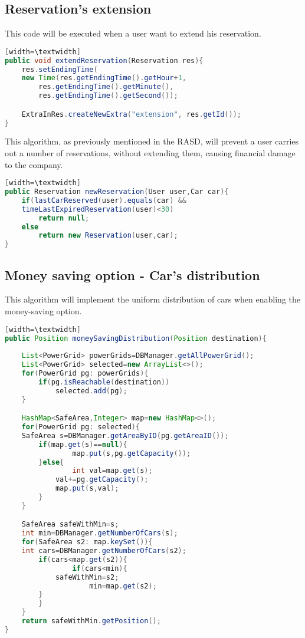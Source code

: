\documentclass[10pt, a4paper,titlepage]{article}
\begin{document}
\subsection*{Reservation's extension}
This code will be executed when a user want to extend his reservation.
\begin{lstlisting}[language=Java][width=\textwidth]
public void extendReservation(Reservation res){
    res.setEndingTime(
	new Time(res.getEndingTime().getHour+1,
		res.getEndingTime().getMinute(),
		res.getEndingTime().getSecond());

    ExtraInRes.createNewExtra("extension", res.getId());
}
\end{lstlisting}
\bigskip
\bigskip
This algorithm, as previously mentioned in the RASD, will prevent a user carries out a number of reservations, without extending them, causing financial damage to the company.
\begin{lstlisting}[language=Java][width=\textwidth]
public Reservation newReservation(User user,Car car){
    if(lastCarReserved(user).equals(car) && 
	timeLastExpiredReservation(user)<30)
        return null;
    else
        return new Reservation(user,car);
}
\end{lstlisting}
\subsection*{Money saving option - Car's distribution}
This algorithm will implement the uniform distribution of cars when enabling the money-saving option.
\begin{lstlisting}[language=Java][width=\textwidth]
public Position moneySavingDistribution(Position destination){
    
    List<PowerGrid> powerGrids=DBManager.getAllPowerGrid();
    List<PowerGrid> selected=new ArrayList<>();
    for(PowerGrid pg: powerGrids){
        if(pg.isReachable(destination))
            selected.add(pg);
    }

    HashMap<SafeArea,Integer> map=new HashMap<>();
    for(PowerGrid pg: selected){
	SafeArea s=DBManager.getAreaByID(pg.getAreaID());
		if(map.get(s)==null){
    			map.put(s,pg.getCapacity());
		}else{
    			int val=map.get(s);
			val+=pg.getCapacity();
			map.put(s,val);
		}
    }

    SafeArea safeWithMin=s;
    int min=DBManager.getNumberOfCars(s);
    for(SafeArea s2: map.keySet()){
	int cars=DBManager.getNumberOfCars(s2);
    	if(cars<map.get(s2)){
        		if(cars<min){
			safeWithMin=s2;
        			min=map.get(s2);
		}
    	}
    }
    return safeWithMin.getPosition();
}
\end{lstlisting}
\clearpage
\end{document}
